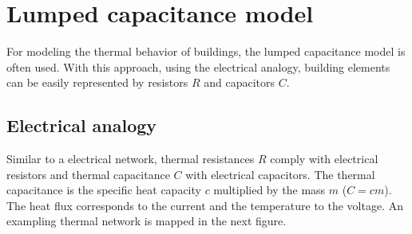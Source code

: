     
\section{Lumped capacitance model}
\label{section:modeling}
For modeling the thermal behavior of buildings, the lumped capacitance model is often used. With this approach, using the electrical analogy, building elements can be easily represented by resistors $R$ and capacitors $C$. \cite{Kramer.2012}

\subsection{Electrical analogy}
\label{electricalanalogy}

    Similar to a electrical network, thermal resistances $R$ comply with electrical resistors and thermal capacitance $C$ with electrical capacitors. The thermal capacitance is the specific heat capacity $c$ multiplied by the mass $m$ ($C=cm$). The heat flux corresponds to the current and the temperature to the voltage.
    An exampling thermal network is mapped in the next figure. 

